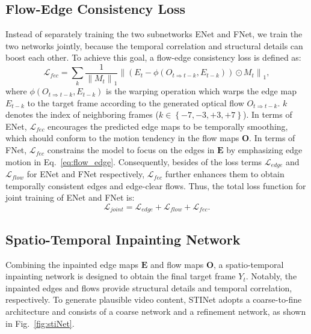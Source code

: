 \subsection{Flow-Edge Consistency Loss}


Instead of separately training the two subnetworks ENet and FNet, we train the two networks jointly, because the temporal correlation and structural details can boost each other.
To achieve this goal, a flow-edge consistency loss is defined as:
%
\begin{equation}
\label{eq:flow_edge}
\mathcal{L}_{fec}=\sum_{k}\frac{1}{\left\|M_{t} \right\|_1}\left\|(E_{t}-\phi(O_{t\Rightarrow t-k},E_{t-k}))\odot M_{t}\right\|_1,
\end{equation}
where $\phi(O_{t\Rightarrow t-k},E_{t-k})$ is the warping operation which warps the edge map $E_{t-k}$ to the target frame according to the generated optical flow $O_{t\Rightarrow t-k}$.
$k$ denotes the index of neighboring frames ($k\in \left\{-7,-3,+3,+7 \right\}$). 
In terms of ENet, $\mathcal{L}_{fec}$ encourages the predicted edge maps to be temporally smoothing, which should conform to the motion tendency in the flow maps $\boldsymbol{O}$. 
In terms of FNet, $\mathcal{L}_{fec}$ constrains the model to focus on the edges in $\boldsymbol{E}$ by emphasizing edge motion in Eq.~\ref{eq:flow_edge}. 
Consequently, besides of the loss terms $\mathcal{L}_{edge}$ and $\mathcal{L}_{flow}$ for ENet and FNet respectively, $\mathcal{L}_{fec}$ further enhances them to obtain temporally consistent edges and edge-clear flows.
Thus, the total loss function for joint training of ENet and FNet is:
\begin{equation}
\label{eq:flow}
\mathcal{L}_{joint}=\mathcal{L}_{edge}+\mathcal{L}_{flow}+ \mathcal{L}_{fec}.
\end{equation}






\subsection{Spatio-Temporal Inpainting Network}

Combining the inpainted edge maps $\boldsymbol{E}$ and flow maps $\boldsymbol{O}$, a spatio-temporal inpainting network  is designed to obtain the final target frame $Y_t$.
Notably, the inpainted edges and flows provide structural details and temporal correlation, respectively.
To generate plausible video content, STINet adopts a coarse-to-fine architecture and consists of a coarse network and a refinement network, as shown in Fig.~\ref{fig:stiNet}.

